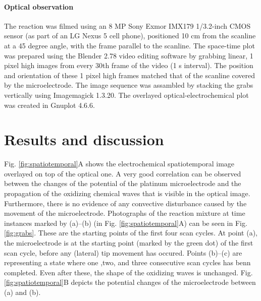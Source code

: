 \documentclass[3p, twocolumn]{elsarticle}
\begin{document}
\paragraph{Optical observation}
The reaction was filmed using an 8 MP Sony Exmor IMX179 1/3.2-inch CMOS sensor (as part of an LG Nexus 5 cell phone), positioned 10 cm from the scanline at a 45 degree angle, with the frame parallel to the scanline.
The space-time plot was prepared using the Blender 2.78 video editing software by grabbing linear, 1 pixel high images from every 30th frame of the video (1 s interval).
The position and orientation of these 1 pixel high frames matched that of the scanline covered by the microelectrode.
The image sequence was assambled by stacking the grabs vertically using Imagemagick 1.3.20.
The overlayed optical-electrochemical plot was created in Gnuplot 4.6.6.



\section{Results and discussion}
Fig. \ref{fig:spatiotemporal}A shows the electrochemical spatiotemporal image overlayed on top of the optical one.
A very good correlation can be observed between the changes of the potential of the platinum microelectrode and the propagation of the oxidizing chemical waves that is visible in the optical image.
Furthermore, there is no evidence of any convective disturbance caused by the movement of the microelectrode.
Photographs of the reaction mixture at time instances marked by (a)--(b) (in Fig. \ref{fig:spatiotemporal}A) can be seen in Fig. \ref{fig:grabs}.
These are the starting points of the first four scan cycles.
At point (a), the microelectrode is at the starting point (marked by the green dot) of the first scan cycle, before any (lateral) tip movement has occured.
Points (b)--(c) are representing a state where one ,two, and three consecutive scan cycles has benn completed.
Even after these, the shape of the oxidizing waves is unchanged.
Fig. \ref{fig:spatiotemporal}B depicts the potential changes of the microelectrode between (a) and (b).
\end{document}
